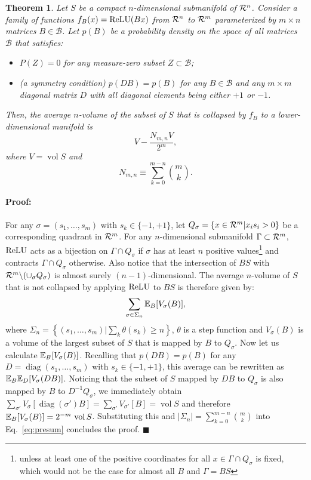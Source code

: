 \documentclass[10pt,twocolumn,letterpaper]{article}
\def\real{{\cal R}}
\newenvironment{proof}{\paragraph{Proof:}}{$\blacksquare$}
\DeclareMathOperator{\diag}{diag}
\DeclareMathOperator{\reluop}{ReLU}
\DeclareMathOperator{\vol}{vol}
\def\relu{\ensuremath \reluop}
\newtheorem{theorem}{Theorem}
\begin{document}
\begin{theorem}
	Let $S$ be a compact $n$-dimensional submanifold of $\real^n$.
	Consider a family of functions $f_B(x)=\relu (B x)$ from $\real^n$ to $\real^m$ parameterized by $m\times n$ matrices $B\in \mathcal{B}$.
	Let $p(B)$ be a probability density on the space of all matrices $\mathcal{B}$ that satisfies:
	\begin{itemize}
		\item $P(Z)=0$ for any measure-zero subset $Z\subset \mathcal{B}$;
		\item (a symmetry condition) $p(D B) = p(B)$ for any $B \in \mathcal{B}$ and any $m \times m$ diagonal matrix $D$ with all diagonal elements being either $+1$ or $-1$.
	\end{itemize}
	Then, the average $n$-volume of the subset of $S$ that is collapsed by $f_B$ to a lower-dimensional manifold is 
	$$
		V - \frac{N_{m,n} V}{2^m},
	$$
	where $V = \vol S$ and 
	$$
		N_{m,n} \equiv \sum_{k=0}^{m-n} \binom{m}{k}.
	$$
\end{theorem}
\begin{proof}
	For any $\sigma=(s_1,\dots,s_m)$ with $s_k \in \{-1,+1\}$, let $Q_\sigma=\{x\in \real^m| x_i s_i > 0\}$ be a corresponding quadrant in $\real^m$.
	For any $n$-dimensional submanifold $\Gamma \subset \real^m$, $\relu$ acts as a bijection on $\Gamma \cap Q_{\sigma}$ if $\sigma$ has at least $n$ positive values\footnote{unless at least one of the positive coordinates for all $x\in \Gamma \cap Q_{\sigma}$ is fixed, which would not be the case for almost all $B$ and $\Gamma = BS$} and contracts $\Gamma \cap Q_{\sigma}$ otherwise.
	Also notice that the intersection of $B S$ with $\real^m \backslash (\cup_\sigma Q_\sigma)$ is almost surely $(n-1)$-dimensional.
	The average $n$-volume of $S$ that is not collapsed by applying $\relu$ to $B S$ is therefore given by:
	\begin{equation}
    	\label{eq:presum}
		\sum_{\sigma\in \Sigma_{n}} \mathbb{E}_{B} [V_\sigma(B)],
	\end{equation}
	where $\Sigma_{n}=\left\{(s_1,\dots,s_m)|\sum_k \theta(s_k) \ge n\right\}$, $\theta$ is a step function and $V_\sigma(B)$ is a volume of the largest subset of $S$ that is mapped by $B$ to $Q_\sigma$.
	Now let us calculate $\mathbb{E}_B [V_\sigma(B)]$.
	Recalling that $p(D B)=p(B)$ for any $D=\diag(s_1,\dots,s_m)$ with $s_k \in \{-1,+1\}$, this average can be rewritten as $\mathbb{E}_B \mathbb{E}_D [V_\sigma(DB)]$.
	Noticing that the subset of $S$ mapped by $D B$ to $Q_\sigma$ is also mapped by $B$ to $D^{-1} Q_\sigma$, we immediately obtain $\sum_{\sigma'} V_\sigma[\diag(\sigma') B] = \sum_{\sigma'} V_{\sigma'}[B] = \vol S$ and therefore $\E_{B} [V_\sigma(B)] = 2^{-m} \, \vol S$.
	Substituting this and $|\Sigma_n|=\sum_{k=0}^{m-n} \binom{m}{k}$ into Eq.~\ref{eq:presum} concludes the proof.
\end{proof}
\end{document}
